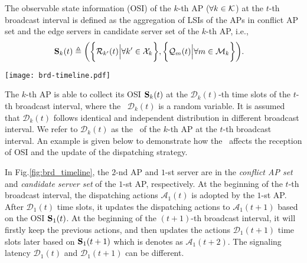 \begin{definition}
    The observable state information (OSI) of the $k$-th AP ($\forall k\in\mathcal{K}$) at the $t$-th broadcast interval is defined as the aggregation of LSIs of the APs in {conflict AP set} and the edge servers in {candidate server set} of the $k$-th AP, i.e.,
    \begin{align}
        \mathbf{S}_{k}(t) &\triangleq
        \bigg(
            \bigg\{\mathcal{R}_{k'}(t) \Big| \forall k'\in\mathcal{X}_{k}\bigg\},
            \bigg\{\mathcal{Q}_{m}(t) \Big| \forall m\in\mathcal{M}_{k}\bigg\}
        \bigg).
    \end{align}
    \label{def:OSI}
\end{definition}

\begin{figure*}[t]
    \centering
    \texttt{[image: brd-timeline.pdf]}
    \caption{The timeline illustration of reception of OSI for the $1$-st AP where $2$-nd AP is in its \emph{conflict AP set} and $1$-st server is in its \emph{candidate server set}.}
    \label{fig:brd_timeline}
\end{figure*}

The $k$-th AP is able to collect its OSI $\mathbf{S}_{k}(t)$ at the $\mathcal{D}_{k}(t)$-th time slots of the $t$-th broadcast interval, where the \brlatency~$\mathcal{D}_{k}(t)$ is a random variable.
It is assumed that $\mathcal{D}_{k}(t)$ follows identical and independent distribution in different broadcast interval.
We refer to $\mathcal{D}_{k}(t)$ as the \brlatency~of the $k$-th AP at the $t$-th broadcast interval.
An example is given below to demonstrate how the \brlatency~affects the reception of OSI and the update of the dispatching strategy.

\begin{example}
    In Fig.\ref{fig:brd_timeline}, the $2$-nd AP and $1$-st server are in the \emph{conflict AP set} and \emph{candidate server set} of the $1$-st AP, respectively.
    At the beginning of the $t$-th broadcast interval, the dispatching actions $\mathcal{A}_{1}(t)$ is adopted by the $1$-st AP.
    After $\mathcal{D}_{1}(t)$ time slots, it updates the dispatching actions to $\mathcal{A}_{1}(t+1)$ based on the OSI $\mathbf{S}_{1}(t)$.
    At the beginning of the $(t+1)$-th broadcast interval, it will firstly keep the previous actions, and then updates the actions $\mathcal{D}_{1}(t+1)$ time slots later based on $\mathbf{S}_{1}(t+1)$ which is denotes as $\mathcal{A}_{1}(t+2)$.
    The signaling latency $\mathcal{D}_1(t)$ and $\mathcal{D}_1(t+1)$ can be different.
\end{example}

